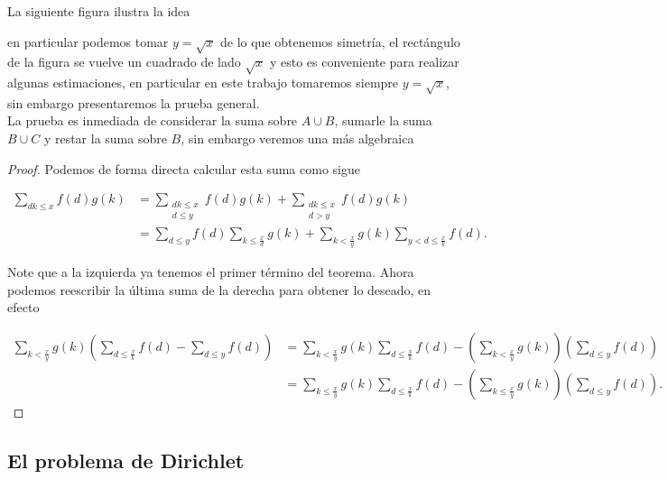 La siguiente figura ilustra la idea

\begin{center}

\end{center}

en particular podemos tomar $y=\sqrt{x}$ de lo que obtenemos simetría, el rectángulo de la figura se vuelve un cuadrado de lado $\sqrt{x}$ y esto es conveniente para realizar algunas estimaciones, en particular en este trabajo tomaremos siempre $y=\sqrt{x}$, sin embargo presentaremos la prueba general.\\

La prueba es inmediada de considerar la suma sobre $A\cup B$, sumarle la suma $B\cup C$ y restar la suma sobre $B$, sin embargo veremos una más algebraica\\

\begin{proof}
Podemos de forma directa calcular esta suma como sigue

$$\begin{aligned}
\sum_{d k \leq x} f(d) g(k) & =\sum_{\substack{d k \leq x \\
d \leq y}} f(d) g(k)+\sum_{\substack{d k \leq x \\
d>y}} f(d) g(k) \\
& =\sum_{d \leq y} f(d) \sum_{k \leq \frac{x}{d}} g(k)+\sum_{k<\frac{x}{y}} g(k) \sum_{y<d \leq \frac{x}{k}} f(d) .
\end{aligned}$$

Note que a la izquierda ya tenemos el primer término del teorema. Ahora podemos reescribir la última suma de la derecha para obtener lo deseado, en efecto


\begin{align*}
    \sum_{k < \frac{x}{y}} g(k) 
\left( 
\sum_{d \leq \frac{x}{k}} f(d) - \sum_{d \leq y} f(d) 
\right)&= \sum_{k < \frac{x}{y}} g(k) \sum_{d \leq \frac{x}{k}} f(d) 
- \left( 
\sum_{k < \frac{x}{y}} g(k) 
\right)
\left( 
\sum_{d \leq y} f(d) 
\right)\\
&=\sum_{k \leq \frac{x}{y}} g(k) \sum_{d \leq \frac{x}{k}} f(d) 
- \left( 
\sum_{k \leq \frac{x}{y}} g(k) 
\right)
\left( 
\sum_{d \leq y} f(d) 
\right)
.\end{align*}
\end{proof}

\subsection{El problema de Dirichlet}


